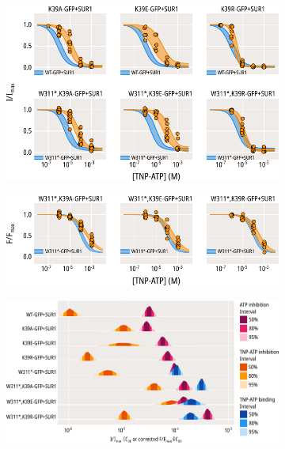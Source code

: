 \begin{figure}[h]
\begin{subfigure}[t]{0.45\textwidth}
		\centering
		\includegraphics[width=\textwidth]{k39_3.pdf}
	\end{subfigure}
	\hfill
	\begin{subfigure}[t]{0.45\textwidth}
		\caption{}\label{ch5fig:k39_tnpatp_popfits_2}
		\centering
		\includegraphics[width=\textwidth]{k39_4.pdf}
	\end{subfigure}
	\vfill
	\begin{subfigure}[t]{0.9\textwidth}
		\caption{}\label{ch5fig:k39_ec50_fits}
		\centering
		\includegraphics[width=\textwidth]{k39_5.pdf}
	\end{subfigure}
	\caption[Functional effects of K39 mutations]{
}
\end{figure}
